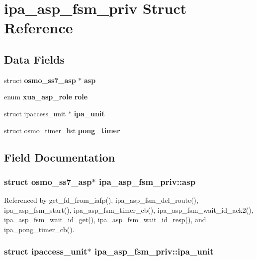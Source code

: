\section{ipa\+\_\+asp\+\_\+fsm\+\_\+priv Struct Reference}
\label{structipa__asp__fsm__priv}
\subsection*{Data Fields}
\begin{DoxyCompactItemize}
\item 
struct {\bf osmo\+\_\+ss7\+\_\+asp} $\ast$ {\bf asp}
\item 
enum {\bf xua\+\_\+asp\+\_\+role} {\bf role}
\item 
struct ipaccess\+\_\+unit $\ast$ {\bf ipa\+\_\+unit}
\item 
struct osmo\+\_\+timer\+\_\+list {\bf pong\+\_\+timer}
\end{DoxyCompactItemize}


\subsection{Field Documentation}
\subsubsection[{asp}]{\setlength{\rightskip}{0pt plus 5cm}struct {\bf osmo\+\_\+ss7\+\_\+asp}$\ast$ ipa\+\_\+asp\+\_\+fsm\+\_\+priv\+::asp}\label{structipa__asp__fsm__priv_a6ba515632b7d52ba567489882f3c6414}


Referenced by get\+\_\+fd\+\_\+from\+\_\+iafp(), ipa\+\_\+asp\+\_\+fsm\+\_\+del\+\_\+route(), ipa\+\_\+asp\+\_\+fsm\+\_\+start(), ipa\+\_\+asp\+\_\+fsm\+\_\+timer\+\_\+cb(), ipa\+\_\+asp\+\_\+fsm\+\_\+wait\+\_\+id\+\_\+ack2(), ipa\+\_\+asp\+\_\+fsm\+\_\+wait\+\_\+id\+\_\+get(), ipa\+\_\+asp\+\_\+fsm\+\_\+wait\+\_\+id\+\_\+resp(), and ipa\+\_\+pong\+\_\+timer\+\_\+cb().

\subsubsection[{ipa\+\_\+unit}]{\setlength{\rightskip}{0pt plus 5cm}struct ipaccess\+\_\+unit$\ast$ ipa\+\_\+asp\+\_\+fsm\+\_\+priv\+::ipa\+\_\+unit}\label{structipa__asp__fsm__priv_a710e544a75b3c16db14380cfcbf518cb}


